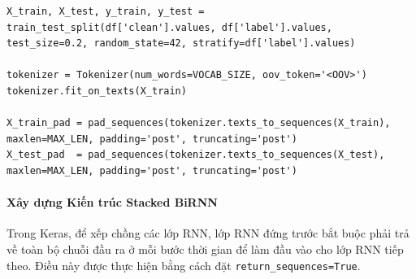 
\begin{lstlisting}[style=pythoncode, caption={Vector hóa văn bản với Tokenizer tự học}]
X_train, X_test, y_train, y_test = train_test_split(df['clean'].values, df['label'].values, test_size=0.2, random_state=42, stratify=df['label'].values)

tokenizer = Tokenizer(num_words=VOCAB_SIZE, oov_token='<OOV>')
tokenizer.fit_on_texts(X_train)

X_train_pad = pad_sequences(tokenizer.texts_to_sequences(X_train), maxlen=MAX_LEN, padding='post', truncating='post')
X_test_pad  = pad_sequences(tokenizer.texts_to_sequences(X_test), maxlen=MAX_LEN, padding='post', truncating='post')
\end{lstlisting}

\paragraph{Xây dựng Kiến trúc Stacked BiRNN} \hfill\mbox{}

Trong Keras, để xếp chồng các lớp RNN, lớp RNN đứng trước bắt buộc phải trả về toàn bộ chuỗi đầu ra ở mỗi bước thời gian để làm đầu vào cho lớp RNN tiếp theo. Điều này được thực hiện bằng cách đặt \texttt{return\_sequences=True}.

